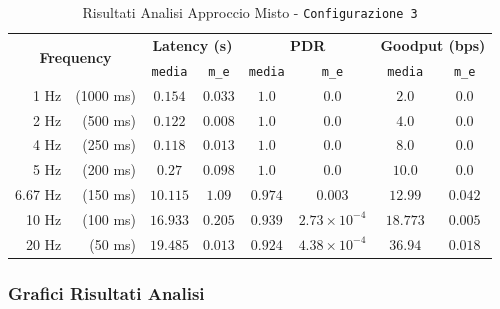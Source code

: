 \begin{table}[hbt!]
    \centering
    \begin{tabular}{ |rr|| c|c|c|c|c|c| } 
        \hline
        \multicolumn{2}{|c||}{\multirow{2}{*}{\textbf{Frequency}}} & \multicolumn{2}{|c|}{\textbf{Latency \scriptsize (s)}} & \multicolumn{2}{|c|}{\textbf{PDR}} & \multicolumn{2}{|c|}{\textbf{Goodput \scriptsize (bps)}} \\
        && \texttt{media} & \texttt{m\_e} & \texttt{media} & \texttt{m\_e} & \texttt{media} & \texttt{m\_e} \\

		\hline
		1 Hz & \scriptsize (1000 ms) & $ 0.154 $ & $ 0.033 $ & $ 1.0 $ & $ 0.0 $ & $ 2.0 $ & $ 0.0 $ \\
		\hline
		2 Hz & \scriptsize (500 ms) & $ 0.122 $ & $ 0.008 $ & $ 1.0 $ & $ 0.0 $ & $ 4.0 $ & $ 0.0 $ \\
		\hline
		4 Hz & \scriptsize (250 ms) & $ 0.118 $ & $ 0.013 $ & $ 1.0 $ & $ 0.0 $ & $ 8.0 $ & $ 0.0 $ \\
		\hline
		5 Hz & \scriptsize (200 ms) & $ 0.27 $ & $ 0.098 $ & $ 1.0 $ & $ 0.0 $ & $ 10.0 $ & $ 0.0 $ \\
		\hline
		6.67 Hz & \scriptsize (150 ms) & $ 10.115 $ & $ 1.09 $ & $ 0.974 $ & $ 0.003 $ & $ 12.99 $ & $ 0.042 $ \\
		\hline
		10 Hz & \scriptsize (100 ms) & $ 16.933 $ & $ 0.205 $ & $ 0.939 $ & $ 2.73 \times 10^{-4} $ & $ 18.773 $ & $ 0.005 $ \\
		\hline
		20 Hz & \scriptsize (50 ms) & $ 19.485 $ & $ 0.013 $ & $ 0.924 $ & $ 4.38 \times 10^{-4} $ & $ 36.94 $ & $ 0.018 $ \\
		\hline
    \end{tabular}
    \caption{Risultati Analisi Approccio Misto - \texttt{Configurazione 3}}
    \label{tab:table_ble_wifi_conf_3}
\end{table}

\subsubsection{Grafici Risultati Analisi}
\label{apex:grafici}

